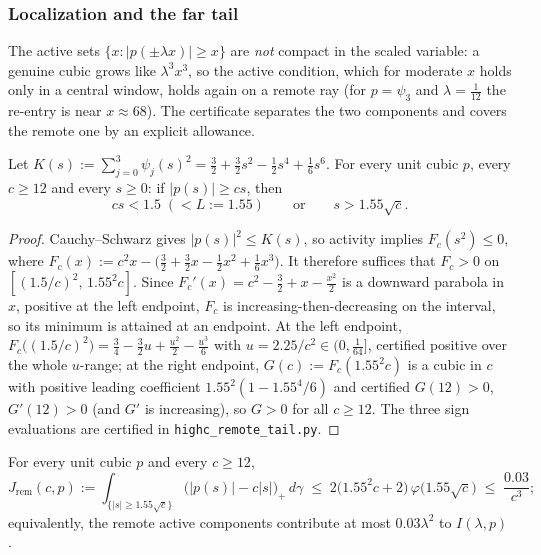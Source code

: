 \subsubsection*{Localization and the far tail}

The active sets $\{x:|p(\pm\lambda x)|\ge x\}$ are \emph{not} compact in the scaled variable: a genuine cubic grows like $\lambda^3x^3$, so the active condition, which for moderate $x$ holds only in a central window, holds again on a remote ray (for $p=\psi_3$ and $\lambda=\tfrac1{12}$ the re-entry is near $x\approx68$). The certificate separates the two components and covers the remote one by an explicit allowance.

\begin{lemma}[Localization]\label{lem:localization}
Let $K(s):=\sum_{j=0}^3\psi_j(s)^2=\tfrac32+\tfrac32s^2-\tfrac12s^4+\tfrac16s^6$. For every unit cubic $p$, every $c\ge12$ and every $s\ge0$: if $|p(s)|\ge cs$, then
\[
        cs<1.5\;(<L:=1.55)
        \qquad\text{or}\qquad
        s>1.55\sqrt c .
\]
\end{lemma}

\begin{proof}
Cauchy--Schwarz gives $|p(s)|^2\le K(s)$, so activity implies $F_c(s^2)\le0$, where $F_c(x):=c^2x-\bigl(\tfrac32+\tfrac32x-\tfrac12x^2+\tfrac16x^3\bigr)$. It therefore suffices that $F_c>0$ on $[(1.5/c)^2,\,1.55^2c]$. Since $F_c'(x)=c^2-\tfrac32+x-\tfrac{x^2}2$ is a downward parabola in $x$, positive at the left endpoint, $F_c$ is increasing-then-decreasing on the interval, so its minimum is attained at an endpoint. At the left endpoint, $F_c\bigl((1.5/c)^2\bigr)=\tfrac34-\tfrac32u+\tfrac{u^2}2-\tfrac{u^3}6$ with $u=2.25/c^2\in(0,\tfrac1{64}]$, certified positive over the whole $u$-range; at the right endpoint, $G(c):=F_c(1.55^2c)$ is a cubic in $c$ with positive leading coefficient $1.55^2(1-1.55^4/6)$ and certified $G(12)>0$, $G'(12)>0$ (and $G'$ is increasing), so $G>0$ for all $c\ge12$. The three sign evaluations are certified in \texttt{highc\_remote\_tail.py}.
\end{proof}

\begin{lemma}\label{lem:remote-tail}
For every unit cubic $p$ and every $c\ge12$,
\[
        J_{\mathrm{rem}}(c,p):=\int_{\{|s|\ge1.55\sqrt c\}}\bigl(|p(s)|-c|s|\bigr)_+\,d\gamma
        \;\le\;2\bigl(1.55^2c+2\bigr)\,\varphi\bigl(1.55\sqrt c\bigr)
        \;\le\;\frac{0.03}{c^3};
\]
equivalently, the remote active components contribute at most $0.03\lambda^2$ to $I(\lambda,p)$.
\end{lemma}

